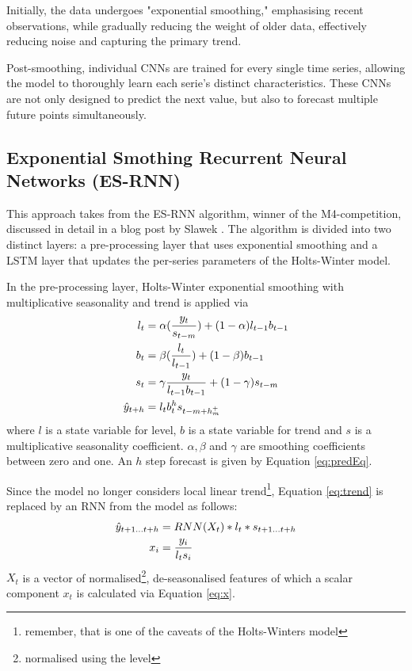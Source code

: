 \documentclass[conference]{IEEEtran}
\begin{document}
Initially, the data undergoes "exponential smoothing," emphasising recent observations, while gradually reducing the weight of older data, effectively reducing noise and capturing the primary trend.

Post-smoothing, individual CNNs are trained for every single time series, allowing the model to thoroughly learn each serie's distinct characteristics. These CNNs are not only designed to predict the next value, but also to forecast multiple future points simultaneously.

\subsection{Exponential Smothing Recurrent Neural Networks (ES-RNN)}

This approach takes from the ES-RNN algorithm, winner of the M4-competition\cite{m4}, discussed in detail in a blog post by Slawek \cite{slawek}. The algorithm is divided into two distinct layers: a pre-processing layer that uses exponential smoothing and a LSTM layer that updates the per-series parameters of the Holts-Winter model.

In the pre-processing layer, Holts-Winter exponential smoothing \cite{winters} with multiplicative seasonality and trend is applied via
\begin{align}
    l_t &= \alpha(\frac{y_t}{s_{t-m}}) + (1 - \alpha)l_{t-1} b_{t-1} \label{eq:level}\\
    b_t &= \beta(\frac{l_t}{l_{t-1}}) + (1- \beta) b_{t-1} \label{eq:trend} \\ 
    s_{t} &= \gamma \frac{y_t}{l_{t-1} b_{t-1}} + (1-\gamma)s_{t-m} \label{eq:season}\\
    \Hat{y}_{t+h} &= l_t  b_t^h s_{t-m+h^+_m} \label{eq:predEq}
\end{align}
where $l$ is a state variable for level, $b$ is a state variable for trend and $s$ is a multiplicative seasonality coefficient. $\alpha, \beta$ and $\gamma$ are smoothing coefficients between zero and one. An $h$ step forecast is given by Equation \ref{eq:predEq}.

Since the model no longer considers local linear trend\footnote{remember, that is one of the caveats of the Holts-Winters model}, Equation \ref{eq:trend} is replaced by an RNN from the model as follows:
\begin{align}
    \Hat{y}_{t+1 \dots t+h} &= RNN(X_t) * l_t * s_{t+1 \dots t+h} \label{eq:modifiedEq}\\
    x_i &= \frac{y_i}{l_t s_i} \label{eq:x}
\end{align}
$X_t$ is a vector of normalised\footnote{normalised using the level}, de-seasonalised features of which a scalar component $x_t$ is calculated via Equation \ref{eq:x}.
\end{document}
